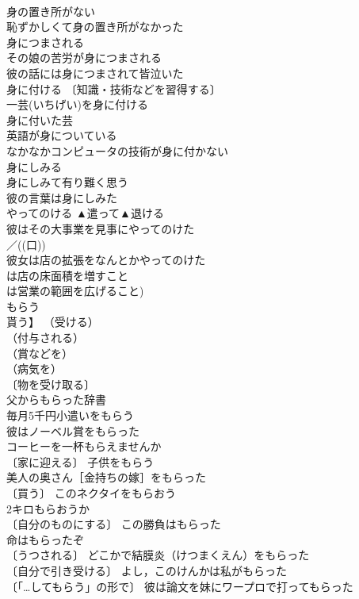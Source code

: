 \documentclass[8pt]{extreport}
\begin{document}
\begin{CJK}{UTF8}{min}
\\	身の置き所がない		
\\	恥ずかしくて身の置き所がなかった 
\\	身につまされる		
\\	その娘の苦労が身につまされる 
\\	彼の話には身につまされて皆泣いた 
\\	身に付ける		〔知識・技術などを習得する〕 
\\	一芸(いちげい)を身に付ける 
\\	身に付いた芸 
\\	英語が身についている 
\\	なかなかコンピュータの技術が身に付かない 
\\	身にしみる		
\\	身にしみて有り難く思う 
\\	彼の言葉は身にしみた 
\\	やってのける	▲遣って▲退ける	
\\	彼はその大事業を見事にやってのけた 
\\	／((口))
\\	彼女は店の拡張をなんとかやってのけた 
\\	は店の床面積を増すこと
\\	は営業の範囲を広げること)
\\	もらう	
\\	貰う】	（受ける）
\\	（付与される）
\\	（賞などを）
\\	（病気を）
\\	〔物を受け取る〕
\\	父からもらった辞書 
\\	毎月5千円小遣いをもらう 
\\	彼はノーベル賞をもらった 
\\	コーヒーを一杯もらえませんか 
\\	〔家に迎える〕 子供をもらう 
\\	美人の奥さん［金持ちの嫁］をもらった 
\\	〔買う〕 このネクタイをもらおう 
\\	2キロもらおうか 
\\	〔自分のものにする〕 この勝負はもらった 
\\	命はもらったぞ 
\\	〔うつされる〕 どこかで結膜炎（けつまくえん）をもらった 
\\	〔自分で引き受ける〕 よし，このけんかは私がもらった 
\\	〔「…してもらう」の形で〕 彼は論文を妹にワープロで打ってもらった 

\end{CJK}
\end{document}
